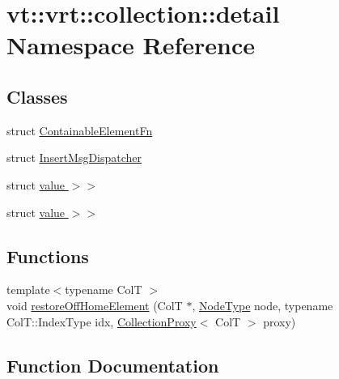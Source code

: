 \hypertarget{namespacevt_1_1vrt_1_1collection_1_1detail}{}\section{vt\+:\+:vrt\+:\+:collection\+:\+:detail Namespace Reference}
\label{namespacevt_1_1vrt_1_1collection_1_1detail}
\subsection*{Classes}
\begin{DoxyCompactItemize}
\item 
struct \hyperlink{structvt_1_1vrt_1_1collection_1_1detail_1_1_containable_element_fn}{Containable\+Element\+Fn}
\item 
struct \hyperlink{structvt_1_1vrt_1_1collection_1_1detail_1_1_insert_msg_dispatcher}{Insert\+Msg\+Dispatcher}
\item 
struct \hyperlink{structvt_1_1vrt_1_1collection_1_1detail_1_1_insert_msg_dispatcher_3_01_msg_t_00_01_col_t_00_01st21bfbb9f37f35dd344d97132b3f17280}{value $>$$>$}
\item 
struct \hyperlink{structvt_1_1vrt_1_1collection_1_1detail_1_1_insert_msg_dispatcher_3_01_msg_t_00_01_col_t_00_01st63328b77cb25348343d0eb4c4a2955e0}{value $>$$>$}
\end{DoxyCompactItemize}
\subsection*{Functions}
\begin{DoxyCompactItemize}
\item 
{\footnotesize template$<$typename ColT $>$ }\\void \hyperlink{namespacevt_1_1vrt_1_1collection_1_1detail_ad802a14290cff6ae06a13add7436f236}{restore\+Off\+Home\+Element} (ColT $\ast$, \hyperlink{namespacevt_a866da9d0efc19c0a1ce79e9e492f47e2}{Node\+Type} node, typename Col\+T\+::\+Index\+Type idx, \hyperlink{structvt_1_1vrt_1_1collection_1_1_collection_proxy}{Collection\+Proxy}$<$ ColT $>$ proxy)
\end{DoxyCompactItemize}


\subsection{Function Documentation}
\mbox{\label{namespacevt_1_1vrt_1_1collection_1_1detail_ad802a14290cff6ae06a13add7436f236}} 
